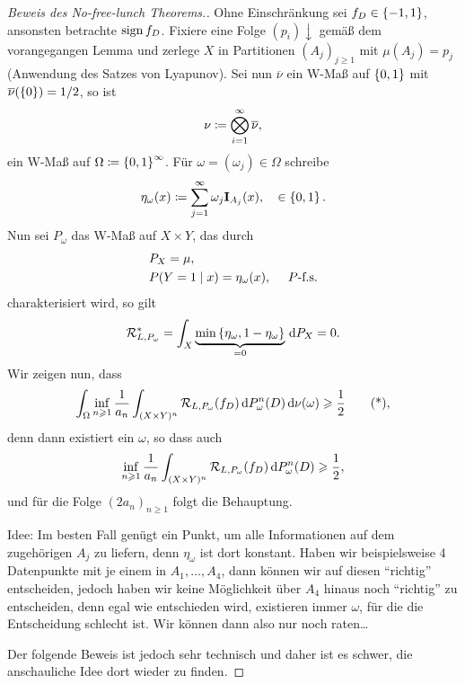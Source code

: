 \begin{proof}[Beweis des No-free-lunch Theorems.]
Ohne Einschränkung sei $f_D \in \left\{ -1,1 \right\}$, ansonsten betrachte $\operatorname{sign} f_D$.
Fixiere eine Folge $(p_i)\downarrow$ gemäß dem vorangegangen Lemma und zerlege
$X$ in Partitionen $(A_j)_{j\ge 1}$ mit $\mu(A_j)=p_j$ (Anwendung des Satzes
von Lyapunov).
Sei nun $\overline{\nu}$ ein W-Maß auf $\left\{ 0,1 \right\}$ mit
$\overline{\nu}(\left\{ 0 \right\}) = 1/2$, so ist
\begin{align*}
\nu \coloneq \bigotimes_{i=1}^\infty \overline{\nu},
\end{align*}
ein W-Maß auf $\Omega\coloneq \left\{ 0,1 \right\}^\infty$. Für $\omega = (\omega_j)\in\Omega$
schreibe
\begin{align*}
\eta_\omega(x) \coloneq \sum_{j=1}^\infty \omega_j \mathbf{I}_{A_j}(x),\quad \in\left\{ 0,1 \right\}.
\end{align*}
Nun sei $P_\omega$ das W-Maß auf $X\times Y$, das durch
\begin{align*}
&P_X = \mu,\\
&P(Y=1\mid x) = \eta_\omega(x),\quad \ P\text{-f.s.}
\end{align*}
charakterisiert wird, so gilt
\begin{align*}
\mathcal{R}_{L,P_\omega}^* = \int_X
\underbrace{\min\left\{ \eta_\omega,1-\eta_\omega \right\}}_{=0} \,\mathrm{d} P_X = 0.
\end{align*}
Wir zeigen nun, dass
\begin{align*}
\int_\Omega \inf_{n\geqslant 1} \frac{1}{a_n} \int_{(X\times Y)^n}
\mathcal{R}_{L,P_\omega}(f_D) \,\mathrm{d} P_\omega^n(D) \,\mathrm{d} \nu(\omega) \geqslant \frac{1}{2}\tag{*},
\end{align*}
denn dann existiert ein $\omega$, so dass auch
\begin{align*}
\inf_{n\geqslant 1} \frac{1}{a_n} \int_{(X\times Y)^n}
\mathcal{R}_{L,P_\omega}(f_D) \,\mathrm{d} P_\omega^n(D) \geqslant \frac{1}{2},
\end{align*}
und für die Folge $(2a_n)_{n\ge 1}$ folgt die Behauptung.

Idee: Im besten Fall genügt ein Punkt, um alle Informationen auf dem
zugehörigen $A_j$ zu liefern, denn $\eta_\omega$ ist dort konstant. Haben wir
beispielsweise 4 Datenpunkte mit je einem in $A_1,\ldots,A_4$, dann können wir
auf diesen ``richtig'' entscheiden, jedoch haben wir keine Möglichkeit über
$A_4$ hinaus noch ``richtig'' zu entscheiden, denn egal wie entschieden wird,
existieren immer $\omega$, für die die Entscheidung schlecht ist. Wir können
dann also nur noch raten\ldots

Der folgende Beweis ist jedoch sehr technisch und daher ist es schwer, die
anschauliche Idee dort wieder zu finden.


\end{proof}
